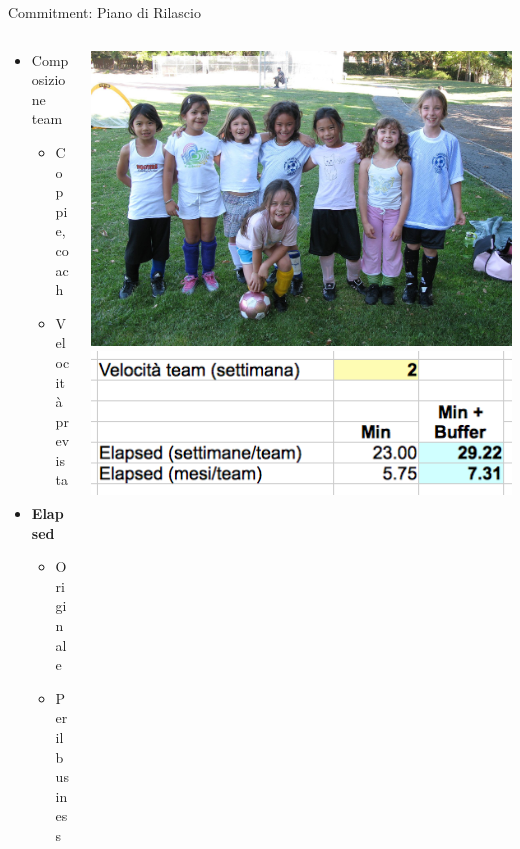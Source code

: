 \documentclass[compress, red, 14pt, pdf]{beamer}
\begin{document}
	\begin{frame}{Commitment: Piano di Rilascio}

		\begin{columns}[T]
		    \begin{column}{.5\textwidth}

				\begin{itemize}
					\item Composizione team
					\begin{itemize}
						\item Coppie, coach
						\item Velocità prevista
					\end{itemize}
				\end{itemize}

				\begin{itemize}
					\item \textbf{Elapsed}
					\begin{itemize}
						\item Originale
						\item Per il business
					\end{itemize}
				\end{itemize}
		
	    	\end{column}
		    \begin{column}{.5\textwidth}
				\hspace*{-0.2cm} \includegraphics[scale=0.35]{images/team}
				\\ \vspace*{0.2cm}
				\hspace*{-0.8cm} \includegraphics[scale=0.4]{images/elapsed}
		    \end{column}
		\end{columns}


\end{frame}
\end{document}
